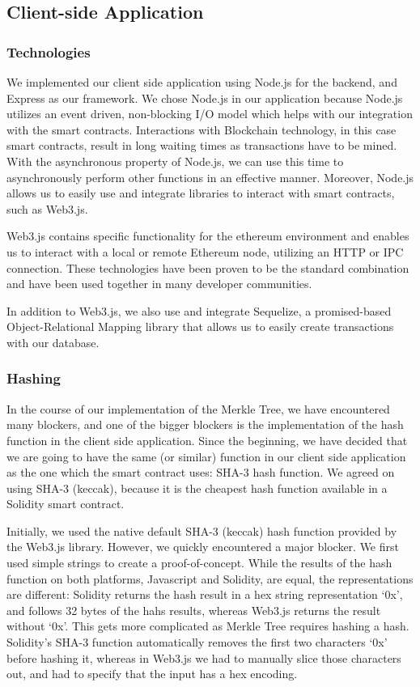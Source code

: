 \subsection{Client-side Application}
\label{subsec:approach-implementation-client}

\subsubsection*{Technologies}

We implemented our client side application using Node.js for the backend, and Express as our framework. We chose Node.js in our application because Node.js utilizes an event driven, non-blocking I/O model which helps with our integration with the smart contracts. Interactions with Blockchain technology, in this case smart contracts, result in long waiting times as transactions have to be mined. With the asynchronous property of Node.js, we can use this time to asynchronously perform other functions in an effective manner. Moreover, Node.js allows us to easily use and integrate libraries to interact with smart contracts, such as Web3.js.

Web3.js contains specific functionality for the ethereum environment and enables us to interact with a local or remote Ethereum node, utilizing an HTTP or IPC connection. These technologies have been proven to be the standard combination and have been used together in many developer communities. 

In addition to Web3.js, we also use and integrate Sequelize, a promised-based Object-Relational Mapping library that allows us to easily create transactions with our database.

\subsubsection*{Hashing}

In the course of our implementation of the Merkle Tree, we have encountered many blockers, and one of the bigger blockers is the implementation of the hash function in the client side application. Since the beginning, we have decided that we are going to have the same (or similar) function in our client side application as the one which the smart contract uses: SHA-3 hash function. We agreed on using SHA-3 (keccak), because it is the cheapest hash function available in a Solidity smart contract. 

Initially, we used the native default SHA-3 (keccak) hash function provided by the Web3.js library. However, we quickly encountered a major blocker. We first used simple strings to create a proof-of-concept. While the results of the hash function on both platforms, Javascript and Solidity, are equal, the representations are different: Solidity returns the hash result in a hex string representation ‘0x’, and follows 32 bytes of the hahs results, whereas Web3.js returns the result without ‘0x’. This gets more complicated as Merkle Tree requires hashing a hash. Solidity’s SHA-3 function automatically removes the first two characters ‘0x’ before hashing it, whereas in Web3.js we had to manually slice those characters out, and had to specify that the input has a hex encoding.

